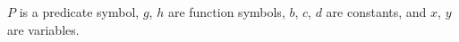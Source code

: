 $P$ is a predicate symbol, $g$, $h$ are function symbols, $b$, $c$, $d$ are constants, and $x$, $y$ are variables.
